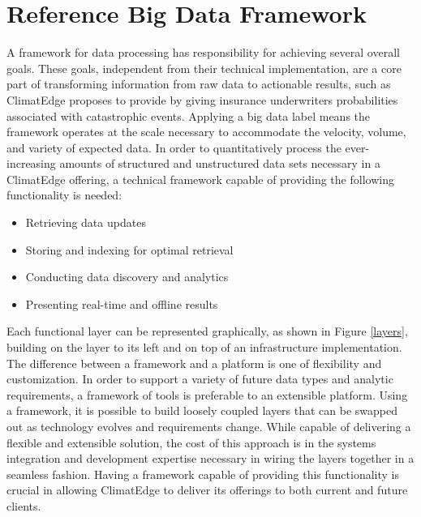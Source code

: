 \section{Reference Big Data Framework}
A framework for data processing has responsibility for achieving several overall goals. These goals, independent from their technical implementation, are a core part of transforming information from raw data to actionable results, such as ClimatEdge proposes to provide by giving insurance underwriters probabilities associated with catastrophic events. Applying a big data label means the framework operates at the scale necessary to accommodate the velocity, volume, and variety of expected data. In order to quantitatively process the ever-increasing amounts of structured and unstructured data sets necessary in a ClimatEdge offering, a technical framework capable of providing the following functionality is needed:
\begin{itemize}
	\item Retrieving data updates
	\item Storing and indexing for optimal retrieval
	\item Conducting data discovery and analytics
	\item Presenting real-time and offline results
\end{itemize}
Each functional layer can be represented graphically, as shown in Figure \ref{layers}, building on the layer to its left and on top of an infrastructure implementation. The difference between a framework and a platform is one of flexibility and customization. In order to support a variety of future data types and analytic requirements, a framework of tools is preferable to an extensible platform. Using a framework, it is possible to build loosely coupled layers that can be swapped out as technology evolves and requirements change. While capable of delivering a flexible and extensible solution, the cost of this approach is in the systems integration and development expertise necessary in wiring the layers together in a seamless fashion. Having a framework capable of providing this functionality is crucial in allowing ClimatEdge to deliver its offerings to both current and future clients.
